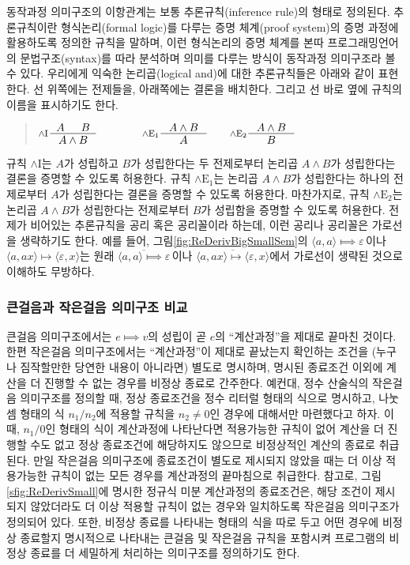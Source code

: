 동작과정 의미구조의 이항관계는 보통
%
%
추론규칙(inference rule)의 형태로 정의된다.
추론규칙이란 형식논리(formal logic)를 다루는 증명 체계(proof system)의
증명 과정에 활용하도록 정의한 규칙을 말하며, 이런 형식논리의 증명 체계를
본따 프로그래밍언어의 문법구조(syntax)를 따라 분석하며 의미를 다루는 방식이
동작과정 의미구조라 볼 수 있다. 우리에게 익숙한 논리곱(logical and)에 대한
추론규칙들은 아래와 같이 표현한다. 선 위쪽에는 전제들을, 아래쪽에는
결론을 배치한다. 그리고 선 바로 옆에 규칙의 이름을 표시하기도 한다.
\begin{quote}
\( \inference*[$\land\mathrm{I}$]{A & B}{A \land B}\qquad\qquad
   \inference[$\land\mathrm{E}_1$]{A\land B}{A} \qquad
   \inference[$\land\mathrm{E}_2$]{A\land B}{B} \)
\end{quote}
규칙 $\land\mathrm{I}$는 $A$가 성립하고 $B$가 성립한다는 두 전제로부터
논리곱 $A\land B$가 성립한다는 결론을 증명할 수 있도록 허용한다.
규칙 $\land\mathrm{E}_1$는 논리곱 $A\land B$가 성립한다는 하나의 전제로부터
$A$가 성립한다는 결론을 증명할 수 있도록 허용한다. 마찬가지로,
규칙 $\land\mathrm{E}_2$는 논리곱 $A\land B$가 성립한다는 전제로부터
$B$가 성립함을 증명할 수 있도록 허용한다. 전제가 비어있는 추론규칙을
공리 혹은 공리꼴이라 하는데, 이런 공리나 공리꼴은 가로선을 생략하기도 한다.
예를 들어, 그림\;\ref{fig:ReDerivBigSmallSem}의
$\langle a, a\rangle\!\Longmapsto\!\varepsilon\,$이나
$\langle a, ax\rangle\!\longmapsto\!\langle\varepsilon, x\rangle$는
원래
$\overline{
  \langle a, a\rangle\!\Longmapsto\!\varepsilon}\,$이나
$\overline{
  \langle a, ax\rangle\!\longmapsto\!\langle\varepsilon, x\rangle}$에서
가로선이 생략된 것으로 이해하도 무방하다.

\subsubsection{큰걸음과 작은걸음 의미구조 비교}
큰걸음 의미구조에서는 $e\Longmapsto v$의 성립이 곧 $e$의 ``계산과정''을
제대로 끝마친 것이다. 한편 작은걸음 의미구조에서는 ``계산과정''이 제대로
끝났는지 확인하는 조건을 (누구나 짐작할만한 당연한 내용이 아니라면) 별도로
명시하며, 명시된 종료조건 이외에 계산을 더 진행할 수 없는 경우를 비정상
종료로 간주한다. 예컨대, 정수 산술식의 작은걸음 의미구조를 정의할 때,
정상 종료조건을 정수 리터럴 형태의 식으로 명시하고, 나눗셈 형태의 식
$n_1 / n_2$에 적용할 규칙을 $n_2\neq 0$인 경우에 대해서만 마련했다고 하자.
이 때, $n_1/0$인 형태의 식이 계산과정에 나타난다면 적용가능한 규칙이 없어
계산을 더 진행할 수도 없고 정상 종료조건에 해당하지도 않으므로 비정상적인
계산의 종료로 취급된다. 만일 작은걸음 의미구조에 종료조건이 별도로 제시되지
않았을 때는 더 이상 적용가능한 규칙이 없는 모든 경우를 계산과정의
끝마침으로 취급한다. 참고로, 그림\;\ref{sfig:ReDerivSmall}에 명시한
정규식 미분 계산과정의 종료조건은, 해당 조건이 제시되지 않았더라도 더 이상
적용할 규칙이 없는 경우와 일치하도록 작은걸음 의미구조가 정의되어 있다.
또한, 비정상 종료를 나타내는 형태의 식을 따로 두고 어떤 경우에 비정상 종료할지
명시적으로 나타내는 큰걸음 및 작은걸음 규칙을 포함시켜
프로그램의 비정상 종료를 더 세밀하게 처리하는 의미구조를 정의하기도 한다.

